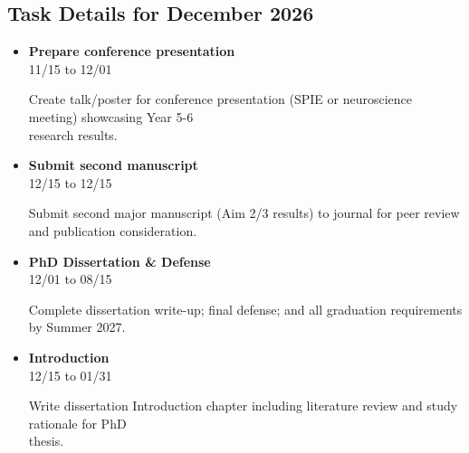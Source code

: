 \documentclass[landscape,a4paper]{article}
\begin{document}
\vspace{0.5cm}
\subsection{Task Details for December 2026}
\begin{itemize}[leftmargin=1cm, itemsep=0.8em]
    \item \textcolor{researchout}{\textbf{Prepare conference presentation}}\\[0.2em]
          \textcolor{black!70}{\small 11/15 to 12/01}
\\[0.3em]
          \begin{minipage}[t]{0.85\textwidth}
          \textcolor{black!80}{Create talk/poster for conference presentation (SPIE or neuroscience meeting) showcasing Year 5-6\\[0.1em]
          research results.}
          \end{minipage}

    \item \textcolor{researchout}{\textbf{Submit second manuscript}}\\[0.2em]
          \textcolor{black!70}{\small 12/15 to 12/15}
\\[0.3em]
          \begin{minipage}[t]{0.85\textwidth}
          \textcolor{black!80}{Submit second major manuscript (Aim 2/3 results) to journal for peer review\\[0.1em]
          and publication consideration.}
          \end{minipage}

    \item \textcolor{other}{\textbf{PhD Dissertation \& Defense}}\\[0.2em]
          \textcolor{black!70}{\small 12/01 to 08/15}
\\[0.3em]
          \begin{minipage}[t]{0.85\textwidth}
          \textcolor{black!80}{Complete dissertation write-up; final defense; and all graduation requirements by Summer 2027.}
          \end{minipage}

    \item \textcolor{other}{\textbf{Introduction}}\\[0.2em]
          \textcolor{black!70}{\small 12/15 to 01/31}
\\[0.3em]
          \begin{minipage}[t]{0.85\textwidth}
          \textcolor{black!80}{Write dissertation Introduction chapter including literature review and study rationale for PhD\\[0.1em]
          thesis.}
          \end{minipage}

\end{itemize}
\end{document}
